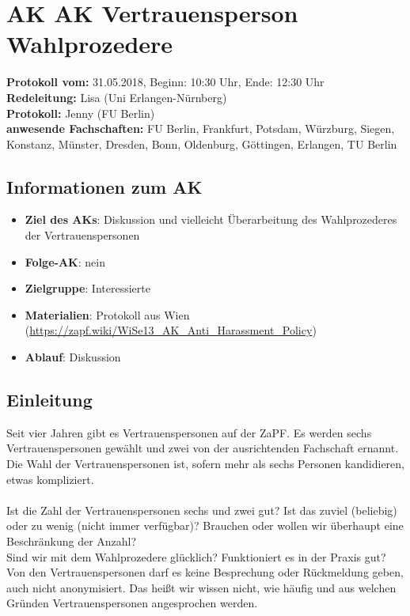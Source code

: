 
\section{AK AK Vertrauensperson Wahlprozedere}

  \textbf{Protokoll vom:} 31.05.2018, %
  Beginn: 10:30 Uhr, %
  Ende: 12:30 Uhr \\ %
  \textbf{Redeleitung:} Lisa (Uni Erlangen-Nürnberg) \\
  \textbf{Protokoll:} Jenny (FU Berlin) \\
  \textbf{anwesende Fachschaften:} FU Berlin, Frankfurt, Potsdam, Würzburg, Siegen, Konstanz, Münster, Dresden, Bonn, Oldenburg, Göttingen, Erlangen, TU Berlin

  \subsection*{Informationen zum AK}
    \begin{itemize}
      \item \textbf{Ziel des AKs}: Diskussion und vielleicht Überarbeitung des Wahlprozederes der Vertrauenspersonen
      \item \textbf{Folge-AK}: nein
      \item \textbf{Zielgruppe}: Interessierte
      \item \textbf{Materialien}: Protokoll aus Wien (\url{https://zapf.wiki/WiSe13_AK_Anti_Harassment_Policy})
      \item \textbf{Ablauf}: Diskussion
    \end{itemize}

  \subsection*{Einleitung}
    Seit vier Jahren gibt es Vertrauenspersonen auf der ZaPF. Es werden sechs Vertrauenspersonen gewählt und zwei von der ausrichtenden Fachschaft ernannt. Die Wahl der Vertrauenspersonen ist, sofern mehr als sechs Personen kandidieren, etwas kompliziert. \\ \\

    Ist die Zahl der Vertrauenspersonen sechs und zwei gut? Ist das zuviel (beliebig) oder zu wenig (nicht immer verfügbar)? Brauchen oder wollen wir überhaupt eine Beschränkung der Anzahl? \\
    Sind wir mit dem Wahlprozedere glücklich? Funktioniert es in der Praxis gut? \\
    Von den Vertrauenspersonen darf es keine Besprechung oder Rückmeldung geben, auch nicht anonymisiert. Das heißt wir wissen nicht, wie häufig und aus welchen Gründen Vertrauenspersonen angesprochen werden. \\ \\

